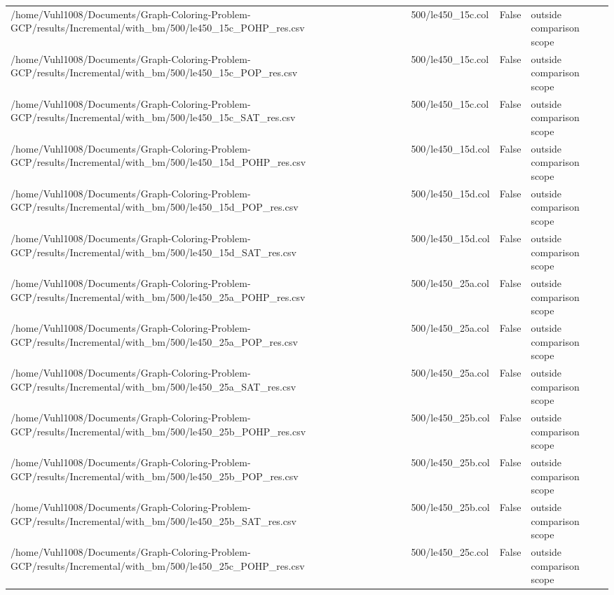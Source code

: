 \begin{table}[htbp]
\begin{tabular}{llll}
/home/Vuhl1008/Documents/Graph-Coloring-Problem-GCP/results/Incremental/with\_bm/500/le450\_15c\_POHP\_res.csv & 500/le450\_15c.col & False & outside comparison scope \\
/home/Vuhl1008/Documents/Graph-Coloring-Problem-GCP/results/Incremental/with\_bm/500/le450\_15c\_POP\_res.csv & 500/le450\_15c.col & False & outside comparison scope \\
/home/Vuhl1008/Documents/Graph-Coloring-Problem-GCP/results/Incremental/with\_bm/500/le450\_15c\_SAT\_res.csv & 500/le450\_15c.col & False & outside comparison scope \\
/home/Vuhl1008/Documents/Graph-Coloring-Problem-GCP/results/Incremental/with\_bm/500/le450\_15d\_POHP\_res.csv & 500/le450\_15d.col & False & outside comparison scope \\
/home/Vuhl1008/Documents/Graph-Coloring-Problem-GCP/results/Incremental/with\_bm/500/le450\_15d\_POP\_res.csv & 500/le450\_15d.col & False & outside comparison scope \\
/home/Vuhl1008/Documents/Graph-Coloring-Problem-GCP/results/Incremental/with\_bm/500/le450\_15d\_SAT\_res.csv & 500/le450\_15d.col & False & outside comparison scope \\
/home/Vuhl1008/Documents/Graph-Coloring-Problem-GCP/results/Incremental/with\_bm/500/le450\_25a\_POHP\_res.csv & 500/le450\_25a.col & False & outside comparison scope \\
/home/Vuhl1008/Documents/Graph-Coloring-Problem-GCP/results/Incremental/with\_bm/500/le450\_25a\_POP\_res.csv & 500/le450\_25a.col & False & outside comparison scope \\
/home/Vuhl1008/Documents/Graph-Coloring-Problem-GCP/results/Incremental/with\_bm/500/le450\_25a\_SAT\_res.csv & 500/le450\_25a.col & False & outside comparison scope \\
/home/Vuhl1008/Documents/Graph-Coloring-Problem-GCP/results/Incremental/with\_bm/500/le450\_25b\_POHP\_res.csv & 500/le450\_25b.col & False & outside comparison scope \\
/home/Vuhl1008/Documents/Graph-Coloring-Problem-GCP/results/Incremental/with\_bm/500/le450\_25b\_POP\_res.csv & 500/le450\_25b.col & False & outside comparison scope \\
/home/Vuhl1008/Documents/Graph-Coloring-Problem-GCP/results/Incremental/with\_bm/500/le450\_25b\_SAT\_res.csv & 500/le450\_25b.col & False & outside comparison scope \\
/home/Vuhl1008/Documents/Graph-Coloring-Problem-GCP/results/Incremental/with\_bm/500/le450\_25c\_POHP\_res.csv & 500/le450\_25c.col & False & outside comparison scope \\

\end{tabular}
\end{table}
